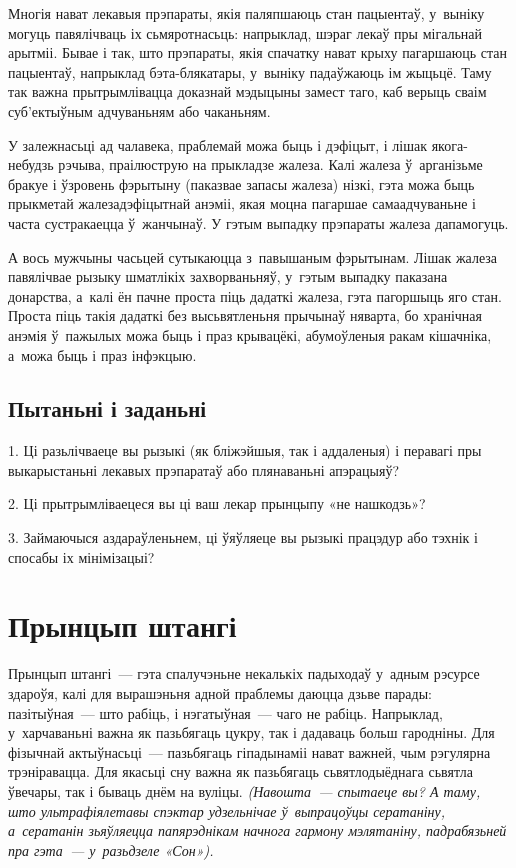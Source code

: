Многія нават лекавыя прэпараты, якія паляпшаюць стан пацыентаў, у~выніку могуць павялічваць іх сьмяротнасьць: напрыклад, шэраг лекаў пры мігальнай арытміі. Бывае і так, што прэпараты, якія спачатку нават крыху пагаршаюць стан пацыентаў, напрыклад бэта-блякатары, у~выніку падаўжаюць ім жыцьцё. Таму так важна прытрымлівацца доказнай мэдыцыны замест таго, каб верыць сваім суб'ектыўным адчуваньням або чаканьням.

У залежнасьці ад чалавека, праблемай можа быць і дэфіцыт, і лішак якога-небудзь рэчыва, праілюструю на прыкладзе жалеза. Калі жалеза ў~арганізьме бракуе і ўзровень фэрытыну (паказвае запасы жалеза) нізкі, гэта можа быць прыкметай жалезадэфіцытнай анэміі, якая моцна пагаршае самаадчуваньне і часта сустракаецца ў~жанчынаў. У гэтым выпадку прэпараты жалеза дапамогуць.

А вось мужчыны часьцей сутыкаюцца з~павышаным фэрытынам. Лішак жалеза павялічвае рызыку шматлікіх захворваньняў, у~гэтым выпадку паказана донарства, а~калі ён пачне проста піць дадаткі жалеза, гэта пагоршыць яго стан. Проста піць такія дадаткі без высьвятленьня прычынаў няварта, бо хранічная анэмія ў~пажылых можа быць і праз крывацёкі, абумоўленыя ракам кішачніка, а~можа быць і праз інфэкцыю.

\subsection*{Пытаньні і заданьні}

1. Ці разьлічваеце вы рызыкі (як бліжэйшыя, так і аддаленыя) і перавагі пры выкарыстаньні лекавых прэпаратаў або плянаваньні апэрацыяў?

2. Ці прытрымліваецеся вы ці ваш лекар прынцыпу «не нашкодзь»?

3. Займаючыся аздараўленьнем, ці ўяўляеце вы рызыкі працэдур або тэхнік і спосабы іх мінімізацыі?


\section{Прынцып штангі}

Прынцып штангі~--- гэта спалучэньне некалькіх падыходаў у~адным рэсурсе здароўя, калі для вырашэньня адной праблемы даюцца дзьве парады: пазітыўная~--- што рабіць, і нэгатыўная~--- чаго не рабіць. Напрыклад, у~харчаваньні важна як пазьбягаць цукру, так і дадаваць больш гародніны. Для фізычнай актыўнасьці~--- пазьбягаць гіпадынаміі нават важней, чым рэгулярна трэніравацца. Для якасьці сну важна як пазьбягаць сьвятлодыёднага сьвятла ўвечары, так і бываць днём на вуліцы. \emph{(Навошта~--- спытаеце вы? А таму, што ультрафіялетавы спэктар удзельнічае ў~выпрацоўцы сератаніну, а~сератанін зьяўляецца папярэднікам начнога гармону мэлятаніну, падрабязьней пра гэта~--- у~разьдзеле «Сон»).}

